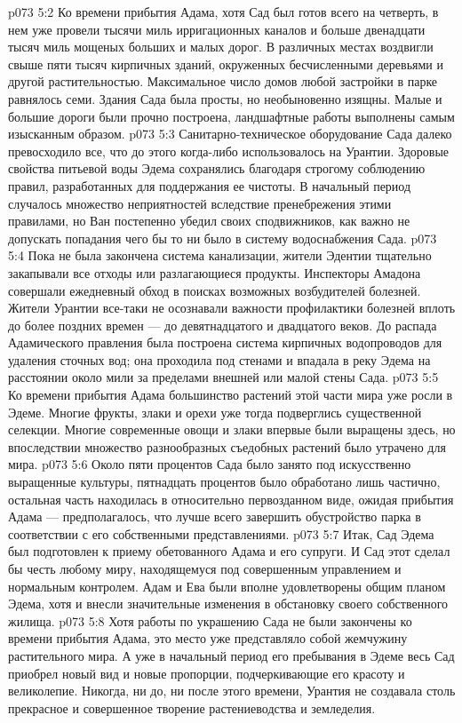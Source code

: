 \vs p073 5:2 Ко времени прибытия Адама, хотя Сад был готов всего на четверть, в нем уже провели тысячи миль ирригационных каналов и больше двенадцати тысяч миль мощеных больших и малых дорог. В различных местах воздвигли свыше пяти тысяч кирпичных зданий, окруженных бесчисленными деревьями и другой растительностью. Максимальное число домов любой застройки в парке равнялось семи. Здания Сада была просты, но необыновенно изящны. Малые и большие дороги были прочно построена, ландшафтные работы выполнены самым изысканным образом.
\vs p073 5:3 Санитарно\hyp{}техническое оборудование Сада далеко превосходило все, что до этого когда\hyp{}либо использовалось на Урантии. Здоровые свойства питьевой воды Эдема сохранялись благодаря строгому соблюдению правил, разработанных для поддержания ее чистоты. В начальный период случалось множество неприятностей вследствие пренебрежения этими правилами, но Ван постепенно убедил своих сподвижников, как важно не допускать попадания чего бы то ни было в систему водоснабжения Сада.
\vs p073 5:4 Пока не была закончена система канализации, жители Эдентии тщательно закапывали все отходы или разлагающиеся продукты. Инспекторы Амадона совершали ежедневный обход в поисках возможных возбудителей болезней. Жители Урантии все\hyp{}таки не осознавали важности профилактики болезней вплоть до более поздних времен --- до девятнадцатого и двадцатого веков. До распада Адамического правления была построена система кирпичных водопроводов для удаления сточных вод; она проходила под стенами и впадала в реку Эдема на расстоянии около мили за пределами внешней или малой стены Сада.
\vs p073 5:5 Ко времени прибытия Адама большинство растений этой части мира уже росли в Эдеме. Многие фрукты, злаки и орехи уже тогда подверглись существенной селекции. Многие современные овощи и злаки впервые были выращены здесь, но впоследствии множество разнообразных съедобных растений было утрачено для мира.
\vs p073 5:6 Около пяти процентов Сада было занято под искусственно выращенные культуры, пятнадцать процентов было обработано лишь частично, остальная часть находилась в относительно первозданном виде, ожидая прибытия Адама --- предполагалось, что лучше всего завершить обустройство парка в соответствии с его собственными представлениями.
\vs p073 5:7 Итак, Сад Эдема был подготовлен к приему обетованного Адама и его супруги. И Сад этот сделал бы честь любому миру, находящемуся под совершенным управлением и нормальным контролем. Адам и Ева были вполне удовлетворены общим планом Эдема, хотя и внесли значительные изменения в обстановку своего собственного жилища.
\vs p073 5:8 Хотя работы по украшению Сада не были закончены ко времени прибытия Адама, это место уже представляло собой жемчужину растительного мира. А уже в начальный период его пребывания в Эдеме весь Сад приобрел новый вид и новые пропорции, подчеркивающие его красоту и великолепие. Никогда, ни до, ни после этого времени, Урантия не создавала столь прекрасное и совершенное творение растениеводства и земледелия.

